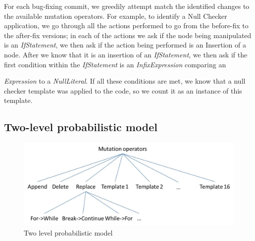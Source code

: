 \documentclass[conference]{IEEEtran}
\begin{document}
For each bug-fixing commit, we greedily attempt match the identified changes to the
available 
mutation operators. For example, to identify
a Null Checker application, we go through all the actions performed to go from the
before-fix to the after-fix versions; in each of the actions we ask if the node
being manipulated is an \emph{IfStatement}, we then  ask if the action being performed
is an Insertion of a node. After we know that it is an insertion of an \emph{IfStatement}, we then ask if the first condition within the \emph{IfStatement} is an
\emph{InfixExpression} comparing an 

\emph{Expression} to a
\emph{NullLiteral}. If all these conditions are met, we know that a null checker
template was applied to the code, so we count it as an instance of this template. 







\subsection{Two-level probabilistic model}

\begin{figure}[!h]
  \centering
    \includegraphics[scale=0.4]{Picture2}
  \caption{Two level probabilistic model}
  \label{fig:probModel}
\end{figure}
\end{document}
